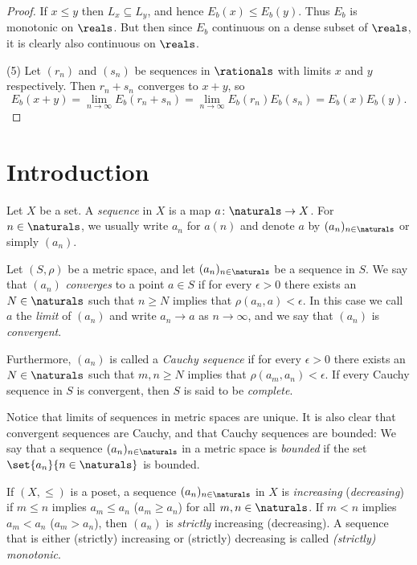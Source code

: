 \documentclass[article, a4paper, 11pt, oneside]{memoir}
\numberwithin{equation}{chapter}
\begin{document}
\begin{proof}
    If $x \leq y$ then $L_x \subseteq L_y$, and hence $E_b(x) \leq E_b(y)$. Thus $E_b$ is monotonic on $\reals$. But then since $E_b$ continuous on a dense subset of $\reals$, it is clearly also continuous on $\reals$.

    (5) Let $(r_n)$ and $(s_n)$ be sequences in $\rationals$ with limits $x$ and $y$ respectively. Then $r_n+s_n$ converges to $x+y$, so
    \begin{equation*}
        E_b(x+y)
            = \lim_{n\to\infty} E_b(r_n + s_n)
            = \lim_{n\to\infty} E_b(r_n) E_b(s_n)
            = E_b(x) E_b(y).
    \end{equation*}
\end{proof}


\chapter{Introduction}

\begin{definition}
    Let $X$ be a set. A \emph{sequence} in $X$ is a map $a \colon \naturals \to X$. For $n \in \naturals$, we usually write $a_n$ for $a(n)$ and denote $a$ by $(a_n)_{n\in\naturals}$ or simply $(a_n)$.
\end{definition}


\begin{definition}
    Let $(S,\rho)$ be a metric space, and let $(a_n)_{n\in\naturals}$ be a sequence in $S$. We say that $(a_n)$ \emph{converges} to a point $a \in S$ if for every $\epsilon > 0$ there exists an $N \in \naturals$ such that $n \geq N$ implies that $\rho(a_n,a) < \epsilon$. In this case we call $a$ the \emph{limit} of $(a_n)$ and write $a_n \to a$ as $n \to \infty$, and we say that $(a_n)$ is \emph{convergent}.

    Furthermore, $(a_n)$ is called a \emph{Cauchy sequence} if for every $\epsilon > 0$ there exists an $N \in \naturals$ such that $m,n \geq N$ implies that $\rho(a_m,a_n) < \epsilon$. If every Cauchy sequence in $S$ is convergent, then $S$ is said to be \emph{complete}.
\end{definition}
%
Notice that limits of sequences in metric spaces are unique. It is also clear that convergent sequences are Cauchy, and that Cauchy sequences are bounded: We say that a sequence $(a_n)_{n\in\naturals}$ in a metric space is \emph{bounded} if the set $\set{a_n}{n\in\naturals}$ is bounded.

If $(X,\leq)$ is a poset, a sequence $(a_n)_{n\in\naturals}$ in $X$ is \emph{increasing} (\emph{decreasing}) if $m \leq n$ implies $a_m \leq a_n$ ($a_m \geq a_n$) for all $m,n \in \naturals$. If $m < n$ implies $a_m < a_n$ ($a_m > a_n$), then $(a_n)$ is \emph{strictly} increasing (decreasing). A sequence that is either (strictly) increasing or (strictly) decreasing is called \emph{(strictly) monotonic}.
\end{document}
